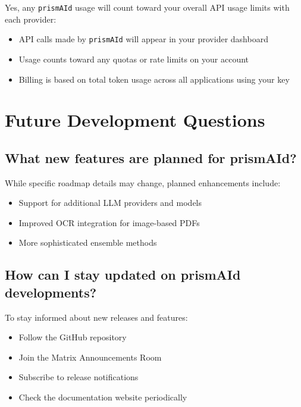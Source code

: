 Yes, any \texttt{prismAId} usage will count toward your overall API usage limits with each provider:

\begin{itemize}
    \item API calls made by \texttt{prismAId} will appear in your provider dashboard
    \item Usage counts toward any quotas or rate limits on your account
    \item Billing is based on total token usage across all applications using your key
\end{itemize}

\section{Future Development Questions}

\subsection{What new features are planned for prismAId?}

While specific roadmap details may change, planned enhancements include:

\begin{itemize}
    \item Support for additional LLM providers and models
    \item Improved OCR integration for image-based PDFs
    \item More sophisticated ensemble methods
\end{itemize}

\subsection{How can I stay updated on prismAId developments?}

To stay informed about new releases and features:

\begin{itemize}
    \item Follow the GitHub repository
    \item Join the Matrix Announcements Room
    \item Subscribe to release notifications
    \item Check the documentation website periodically
\end{itemize}

